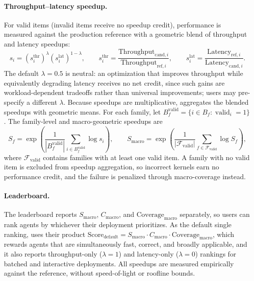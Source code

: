 \paragraph{Throughput--latency speedup.}
For valid items (invalid items receive no speedup credit), performance is measured against the production reference with a geometric blend of throughput and latency speedups:
\begin{equation}
s_i =
\left(s_i^{\mathrm{thr}}\right)^{\lambda}
\left(s_i^{\mathrm{lat}}\right)^{1-\lambda},
\qquad
s_i^{\mathrm{thr}} =
\frac{\mathrm{Throughput}_{\mathrm{cand},i}}
     {\mathrm{Throughput}_{\mathrm{ref},i}},
\qquad
s_i^{\mathrm{lat}} =
\frac{\mathrm{Latency}_{\mathrm{ref},i}}
     {\mathrm{Latency}_{\mathrm{cand},i}}.
\end{equation}
The default $\lambda = 0.5$ is neutral: an optimization that improves throughput while equivalently degrading latency receives no net credit, since such gains are workload-dependent tradeoffs rather than universal improvements; users may pre-specify a different $\lambda$.
Because speedups are multiplicative, \FastKernels aggregates the blended speedups with geometric means.
For each family, let $B_f^{\mathrm{valid}} = \{i \in B_f : \operatorname{valid}_i = 1\}$.
The family-level and macro-geometric speedups are
\begin{equation}
S_f =
\exp\left(
\frac{1}{|B_f^{\mathrm{valid}}|}
\sum_{i \in B_f^{\mathrm{valid}}}\log s_i
\right),
\qquad
S_{\mathrm{macro}} =
\exp\left(
\frac{1}{|\mathcal{F}_{\mathrm{valid}}|}
\sum_{f \in \mathcal{F}_{\mathrm{valid}}}\log S_f
\right),
\end{equation}
where $\mathcal{F}_{\mathrm{valid}}$ contains families with at least one valid item.
A family with no valid item is excluded from speedup aggregation, so incorrect kernels earn no performance credit, and the failure is penalized through macro-coverage instead.

\paragraph{Leaderboard.}
The leaderboard reports $S_{\mathrm{macro}}$, $C_{\mathrm{macro}}$, and $\mathrm{Coverage}_{\mathrm{macro}}$ separately, so users can rank agents by whichever their deployment prioritizes.
As the default single ranking, \FastKernels uses their product $\mathrm{Score}_{\mathrm{default}} = S_{\mathrm{macro}} \cdot C_{\mathrm{macro}} \cdot \mathrm{Coverage}_{\mathrm{macro}}$, which rewards agents that are simultaneously fast, correct, and broadly applicable, and it also reports throughput-only ($\lambda{=}1$) and latency-only ($\lambda{=}0$) rankings for batched and interactive deployments.
All speedups are measured empirically against the reference, without speed-of-light or roofline bounds.

